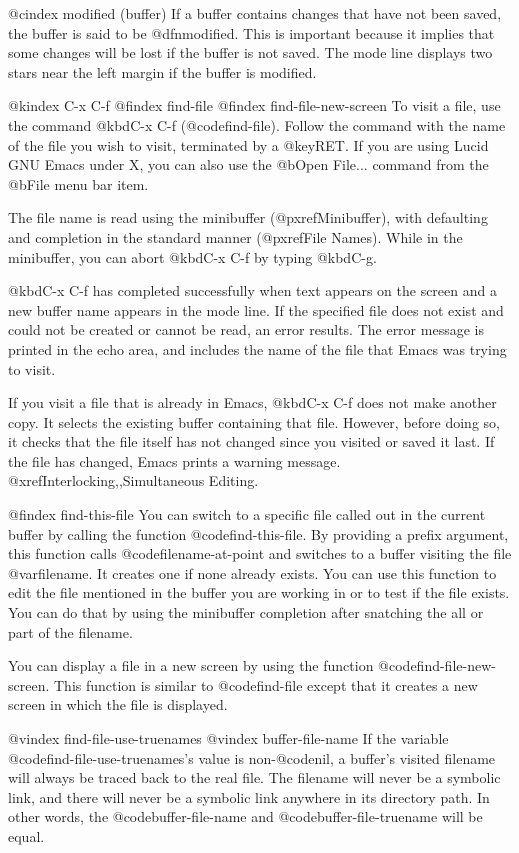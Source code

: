 {{{{{{{{{{{{{{{{@cindex modified (buffer)
  If a buffer contains changes that have not been saved, the buffer is said
to be @dfn{modified}.  This is important because it implies that some
changes will be lost if the buffer is not saved.  The mode line displays
two stars near the left margin if the buffer is modified.

@kindex C-x C-f
@findex find-file
@findex find-file-new-screen
  To visit a file, use the command @kbd{C-x C-f} (@code{find-file}).  Follow
the command with the name of the file you wish to visit, terminated by a
@key{RET}.  If you are using Lucid GNU Emacs under X, you can also use the
@b{Open File...} command from the @b{File} menu bar item. 

  The file name is read using the minibuffer (@pxref{Minibuffer}), with
defaulting and completion in the standard manner (@pxref{File Names}).
While in the minibuffer, you can abort @kbd{C-x C-f} by typing @kbd{C-g}.

  @kbd{C-x C-f} has completed successfully when text appears on the
screen and a new buffer name appears in the mode line.  If the specified
file does not exist and could not be created or cannot be read, an error
results.  The error message is printed in the echo area, and includes
the name of the file that Emacs was trying to visit.

  If you visit a file that is already in Emacs, @kbd{C-x C-f} does not make
another copy.  It selects the existing buffer containing that file.
However, before doing so, it checks that the file itself has not changed
since you visited or saved it last.  If the file has changed, Emacs
prints a warning message.  @xref{Interlocking,,Simultaneous Editing}.

@findex find-this-file
You can switch to a specific file called out in the current buffer by
calling the function @code{find-this-file}. By providing a prefix
argument, this function calls @code{filename-at-point} and switches to a
buffer visiting the file @var{filename}. It creates one if none already
exists. You can use this function to edit the file mentioned in the
buffer you are working in or to test if the file exists. You can do that
by using the minibuffer completion after snatching the all or part of
the filename.

 You can display a file in a new screen by using the function
@code{find-file-new-screen}. This function is similar to
@code{find-file} except that it creates a new screen in which the file
is displayed.

@vindex find-file-use-truenames
@vindex buffer-file-name
If the variable @code{find-file-use-truenames}'s value is
non-@code{nil}, a buffer's visited filename will always be traced back
to the real file. The filename will never be a symbolic link, and there
will never be a symbolic link anywhere in its directory path. In other
words, the @code{buffer-file-name} and @code{buffer-file-truename} will
be equal.

}}}}}}}}}}}}}}}}
